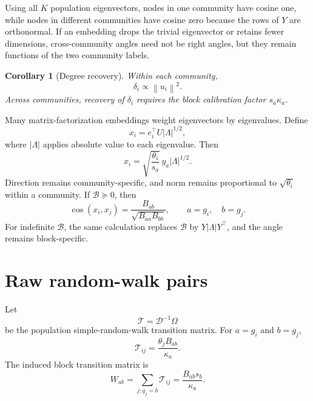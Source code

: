 \documentclass[aps,pre,reprint,superscriptaddress,longbibliography]{revtex4-2}
\newcommand{\norm}[1]{\left\lVert #1 \right\rVert}
\newcommand{\abs}[1]{\left\lvert #1 \right\rvert}
\newtheorem{corollary}[theorem]{Corollary}
\begin{document}
Using all \(K\) population eigenvectors, nodes in one community have cosine one, while nodes in different communities have cosine zero because the rows of \(Y\) are orthonormal.
If an embedding drops the trivial eigenvector or retains fewer dimensions, cross-community angles need not be right angles, but they remain functions of the two community labels.

\begin{corollary}[Degree recovery]
\label{cor:spectral-degree}
Within each community,
\begin{equation}
    \delta_i\propto\norm{u_i}^2.
\end{equation}
Across communities, recovery of \(\delta_i\) requires the block calibration factor \(s_a\kappa_a\).
\end{corollary}

Many matrix-factorization embeddings weight eigenvectors by eigenvalues.
Define
\begin{equation}
    x_i=e_i^\top U\abs{\Lambda}^{1/2},
    \label{eq:weighted-spectral-embedding}
\end{equation}
where \(\abs{\Lambda}\) applies absolute value to each eigenvalue.
Then
\begin{equation}
    x_i
    =
    \sqrt{\frac{\theta_i}{s_a}}\,
    y_a\abs{\Lambda}^{1/2}.
    \label{eq:weighted-row}
\end{equation}
Direction remains community-specific, and norm remains proportional to \(\sqrt{\theta_i}\) within a community.
If \(\mathcal{B}\succeq 0\), then
\begin{equation}
    \cos(x_i,x_j)
    =
    \frac{B_{ab}}{\sqrt{B_{aa}B_{bb}}},
    \qquad
    a=g_i,\quad b=g_j.
    \label{eq:block-affinity-cosine}
\end{equation}
For indefinite \(\mathcal{B}\), the same calculation replaces \(\mathcal{B}\) by \(Y\abs{\Lambda}Y^\top\), and the angle remains block-specific.

\section{Raw random-walk pairs}
\label{sec:raw-pairs}

Let
\begin{equation}
    \mathcal{T}=\mathcal{D}^{-1}\Omega
    \label{eq:transition}
\end{equation}
be the population simple-random-walk transition matrix.
For \(a=g_i\) and \(b=g_j\),
\begin{equation}
    \mathcal{T}_{ij}=\frac{\theta_jB_{ab}}{\kappa_a}.
    \label{eq:transition-entry}
\end{equation}
The induced block transition matrix is
\begin{equation}
    W_{ab}
    =
    \sum_{j:g_j=b}\mathcal{T}_{ij}
    =
    \frac{B_{ab}s_b}{\kappa_a}.
    \label{eq:block-transition}
\end{equation}
\end{document}
